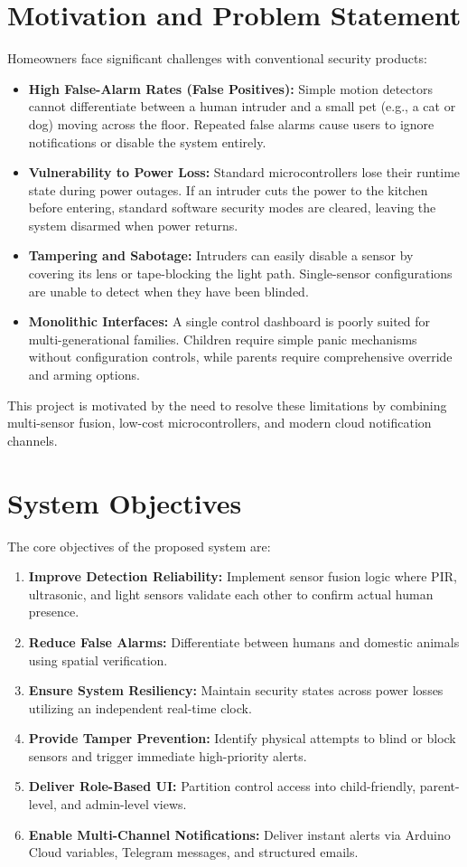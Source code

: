 \documentclass[11pt,a4paper]{report}
\begin{document}
\section{Motivation and Problem Statement}
Homeowners face significant challenges with conventional security products:
\begin{itemize}
    \item \textbf{High False-Alarm Rates (False Positives):} Simple motion detectors cannot differentiate between a human intruder and a small pet (e.g., a cat or dog) moving across the floor. Repeated false alarms cause users to ignore notifications or disable the system entirely.
    \item \textbf{Vulnerability to Power Loss:} Standard microcontrollers lose their runtime state during power outages. If an intruder cuts the power to the kitchen before entering, standard software security modes are cleared, leaving the system disarmed when power returns.
    \item \textbf{Tampering and Sabotage:} Intruders can easily disable a sensor by covering its lens or tape-blocking the light path. Single-sensor configurations are unable to detect when they have been blinded.
    \item \textbf{Monolithic Interfaces:} A single control dashboard is poorly suited for multi-generational families. Children require simple panic mechanisms without configuration controls, while parents require comprehensive override and arming options.
\end{itemize}
This project is motivated by the need to resolve these limitations by combining multi-sensor fusion, low-cost microcontrollers, and modern cloud notification channels.
\section{System Objectives}
The core objectives of the proposed system are:
\begin{enumerate}
    \item \textbf{Improve Detection Reliability:} Implement sensor fusion logic where PIR, ultrasonic, and light sensors validate each other to confirm actual human presence.
    \item \textbf{Reduce False Alarms:} Differentiate between humans and domestic animals using spatial verification.
    \item \textbf{Ensure System Resiliency:} Maintain security states across power losses utilizing an independent real-time clock.
    \item \textbf{Provide Tamper Prevention:} Identify physical attempts to blind or block sensors and trigger immediate high-priority alerts.
    \item \textbf{Deliver Role-Based UI:} Partition control access into child-friendly, parent-level, and admin-level views.
    \item \textbf{Enable Multi-Channel Notifications:} Deliver instant alerts via Arduino Cloud variables, Telegram messages, and structured emails.
\end{enumerate}
\end{document}
